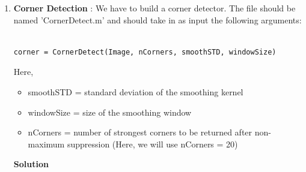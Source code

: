 \documentclass{assignment}
\begin{document}
\begin{problemlist}
\begin{enumerate}[label*=\arabic*.]

\item \textbf{Corner Detection} : We have to build a corner detector. The file should be named 'CornerDetect.m' and should take in as input the following arguments:

\begin{verbatim}

corner = CornerDetect(Image, nCorners, smoothSTD, windowSize)

\end{verbatim}

Here, 

\begin{itemize}

\item smoothSTD = standard deviation of the smoothing kernel

\item windowSize = size of the smoothing window

\item nCorners = number of strongest corners to be returned after non-maximum suppression (Here, we will use nCorners = 20)

\end{itemize}

\textbf{Solution}


\end{enumerate}
\end{problemlist}
\end{document}
